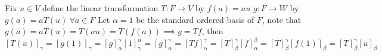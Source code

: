 Fix $u\in V$ define the linear transformation $T : F \longrightarrow V$ by $f(a)  = au$  $g : F\longrightarrow W$ by $g(a) = aT(u)\ \forall a \in F$ Let $\alpha = {1}$ be the standard ordered basis of $F$, note that $g(a) = aT(u) = T(au) = T(f(a)) \implies g = Tf$, then
$$[T(u)]_{\gamma} = [g(1)]_{\gamma} = [g]_{\alpha}^{\gamma}[1]_{\gamma}^{\alpha} = [g]_{\alpha}^{\gamma} = [Tf]_{\alpha}^{\gamma} = [T]_{\beta}^{\gamma}[f]_{\alpha}^{\beta}=[T]_{\beta}^{\gamma}[f(1)]_{\beta} = [T]_{\beta}^{\gamma}[u]_{\beta}$$